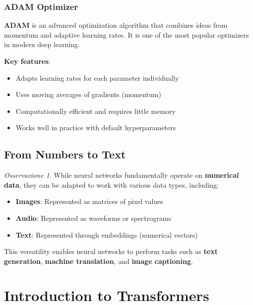 \documentclass[11pt,a4paper]{article}
\theoremstyle{definition}
\theoremstyle{plain}
\theoremstyle{remark}
\newtheorem*{observation}{Osservazione}
\begin{document}
\subsubsection{ADAM Optimizer}

\begin{tcolorbox}[colback=purple!5!white,colframe=purple!75!black,title=\textbf{ADAM (Adaptive Moment Estimation)}]
\textbf{ADAM} is an advanced optimization algorithm that combines ideas from momentum and adaptive learning rates. It is one of the most popular optimizers in modern deep learning.

\textbf{Key features}:
\begin{itemize}
    \item Adapts learning rates for each parameter individually
    \item Uses moving averages of gradients (momentum)
    \item Computationally efficient and requires little memory
    \item Works well in practice with default hyperparameters
\end{itemize}
\end{tcolorbox}

\subsection{From Numbers to Text}

\begin{observation}
While neural networks fundamentally operate on \textbf{numerical data}, they can be adapted to work with various data types, including:
\begin{itemize}
    \item \textbf{Images}: Represented as matrices of pixel values
    \item \textbf{Audio}: Represented as waveforms or spectrograms
    \item \textbf{Text}: Represented through embeddings (numerical vectors)
\end{itemize}

This versatility enables neural networks to perform tasks such as \textbf{text generation}, \textbf{machine translation}, and \textbf{image captioning}.
\end{observation}

\section{Introduction to Transformers}
\end{document}
